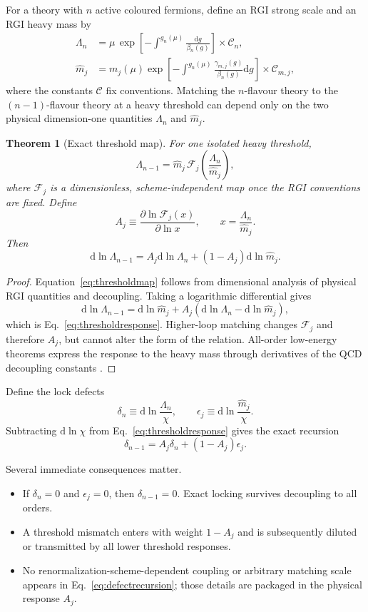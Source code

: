 \documentclass[11pt,a4paper]{article}
\newtheorem{theorem}[definition]{Theorem}
\newcommand{\dd}{\mathrm{d}}
\begin{document}
For a theory with $n$ active coloured fermions, define an RGI strong scale and an RGI heavy mass by
\begin{align}
\Lambda_n
&=\mu\,
\exp\left[-\int^{g_n(\mu)}\frac{\dd g}{\beta_n(g)}\right]
\times \mathcal C_n,
\label{eq:rgilambda}\\
\widehat m_j
&=m_j(\mu)
\exp\left[-\int^{g_n(\mu)}\frac{\gamma_{m,j}(g)}{\beta_n(g)}\dd g\right]
\times \mathcal C_{m,j},
\label{eq:rgimass}
\end{align}
where the constants $\mathcal C$ fix conventions. Matching the $n$-flavour theory to the $(n-1)$-flavour theory at a heavy threshold can depend only on the two physical dimension-one quantities $\Lambda_n$ and $\widehat m_j$.

\begin{theorem}[Exact threshold map]
For one isolated heavy threshold,
\[
\boxed{
\Lambda_{n-1}
=\widehat m_j\,
\mathcal F_j\!\left(\frac{\Lambda_n}{\widehat m_j}\right),
}
\label{eq:thresholdmap}
\]
where $\mathcal F_j$ is a dimensionless, scheme-independent map once the RGI conventions are fixed. Define
\[
A_j\equiv
\frac{\partial\ln\mathcal F_j(x)}{\partial\ln x},
\qquad x=\frac{\Lambda_n}{\widehat m_j}.
\label{eq:Aj}
\]
Then
\[
\boxed{
\dd\ln\Lambda_{n-1}
=A_j\dd\ln\Lambda_n
+(1-A_j)\dd\ln\widehat m_j.
}
\label{eq:thresholdresponse}
\]
\end{theorem}

\begin{proof}
Equation~\eqref{eq:thresholdmap} follows from dimensional analysis of physical RGI quantities and decoupling. Taking a logarithmic differential gives
\[
\dd\ln\Lambda_{n-1}
=\dd\ln\widehat m_j
+A_j(\dd\ln\Lambda_n-\dd\ln\widehat m_j),
\]
which is Eq.~\eqref{eq:thresholdresponse}. Higher-loop matching changes $\mathcal F_j$ and therefore $A_j$, but cannot alter the form of the relation. All-order low-energy theorems express the response to the heavy mass through derivatives of the QCD decoupling constants \cite{Chetyrkin1998}.
\end{proof}

Define the lock defects
\[
\delta_n\equiv\dd\ln\frac{\Lambda_n}{\chi},
\qquad
\epsilon_j\equiv\dd\ln\frac{\widehat m_j}{\chi}.
\label{eq:defects}
\]
Subtracting $\dd\ln\chi$ from Eq.~\eqref{eq:thresholdresponse} gives the exact recursion
\[
\boxed{
\delta_{n-1}=A_j\delta_n+(1-A_j)\epsilon_j.
}
\label{eq:defectrecursion}
\]

Several immediate consequences matter.

\begin{itemize}
  \item If $\delta_n=0$ and $\epsilon_j=0$, then $\delta_{n-1}=0$. Exact locking survives decoupling to all orders.
  \item A threshold mismatch enters with weight $1-A_j$ and is subsequently diluted or transmitted by all lower threshold responses.
  \item No renormalization-scheme-dependent coupling or arbitrary matching scale appears in Eq.~\eqref{eq:defectrecursion}; those details are packaged in the physical response $A_j$.
\end{itemize}
\end{document}
